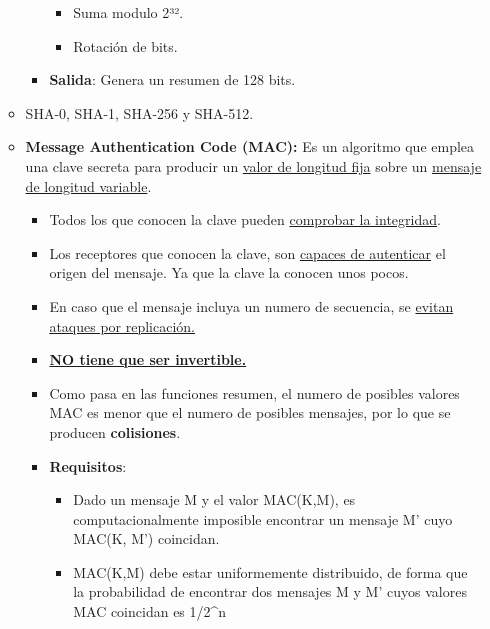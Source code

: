 \documentclass[12pt, twoside, openright]{report} %
\begin{document}
\begin{itemize}
\begin{itemize}
\begin{itemize}
\begin{itemize}
        \item Suma modulo 2³².
          
        \item Rotación de bits.
          
        \end{itemize}
      \item \textbf{Salida}: Genera un resumen de 128 bits.
        
      \end{itemize}
    \item SHA-0, SHA-1, SHA-256 y SHA-512.
      
    \item \textbf{Message Authentication Code (MAC):} Es un algoritmo que
      emplea una clave secreta para producir un \underline{valor de
      longitud fija} sobre un \underline{mensaje de longitud variable}.
      

      \begin{itemize}
      \item Todos los que conocen la clave pueden \underline{comprobar la
        integridad}.
        
      \item Los receptores que conocen la clave, son \underline{capaces de
        autenticar} el origen del mensaje. Ya que la clave la conocen
        unos pocos.
        
      \item En caso que el mensaje incluya un numero de secuencia, se
        \underline{evitan ataques por replicación.}
        
      \item \textbf{\underline{NO tiene que ser invertible.}}
        
      \item Como pasa en las funciones resumen, el numero de posibles
        valores MAC es menor que el numero de posibles mensajes, por lo
        que se producen \textbf{colisiones}.
        
      \item \textbf{Requisitos}:
        

        \begin{itemize}
        \item Dado un mensaje M y el valor MAC(K,M), es computacionalmente
          imposible encontrar un mensaje M' cuyo MAC(K, M') coincidan.
          
        \item MAC(K,M) debe estar uniformemente distribuido, de forma que la
          probabilidad de encontrar dos mensajes M y M' cuyos valores
          MAC coincidan es 1/2\^{}n
          

\end{itemize}
\end{itemize}
\end{itemize}
\end{itemize}
\end{document}
